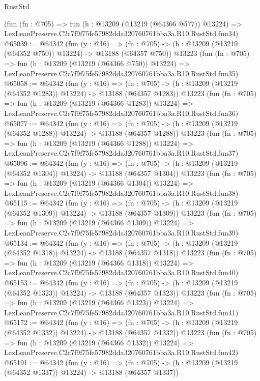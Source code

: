 \begin{lexlean}{RustStd}
\begin{coremodule}
    (fun (fn : @705) =>
    fun (h : @13209 (@13219 (@64366 @577)) @13224) =>
    LexLeanPreserve.C2c7f9f75fe57982dda320760761bba3a.R10.RustStd.fun34)
@65039 := @64342
    (fun (y : @16) =>
    (fn : @705) -> (h : @13209 (@13219 (@64352 @750)) @13224) -> @13188 (@64357 @750))
    @13223
    (fun (fn : @705) =>
    fun (h : @13209 (@13219 (@64366 @750)) @13224) =>
    LexLeanPreserve.C2c7f9f75fe57982dda320760761bba3a.R10.RustStd.fun35)
@65058 := @64342
    (fun (y : @16) =>
    (fn : @705) -> (h : @13209 (@13219 (@64352 @1283)) @13224) -> @13188 (@64357 @1283))
    @13223
    (fun (fn : @705) =>
    fun (h : @13209 (@13219 (@64366 @1283)) @13224) =>
    LexLeanPreserve.C2c7f9f75fe57982dda320760761bba3a.R10.RustStd.fun36)
@65077 := @64342
    (fun (y : @16) =>
    (fn : @705) -> (h : @13209 (@13219 (@64352 @1288)) @13224) -> @13188 (@64357 @1288))
    @13223
    (fun (fn : @705) =>
    fun (h : @13209 (@13219 (@64366 @1288)) @13224) =>
    LexLeanPreserve.C2c7f9f75fe57982dda320760761bba3a.R10.RustStd.fun37)
@65096 := @64342
    (fun (y : @16) =>
    (fn : @705) -> (h : @13209 (@13219 (@64352 @1304)) @13224) -> @13188 (@64357 @1304))
    @13223
    (fun (fn : @705) =>
    fun (h : @13209 (@13219 (@64366 @1304)) @13224) =>
    LexLeanPreserve.C2c7f9f75fe57982dda320760761bba3a.R10.RustStd.fun38)
@65115 := @64342
    (fun (y : @16) =>
    (fn : @705) -> (h : @13209 (@13219 (@64352 @1309)) @13224) -> @13188 (@64357 @1309))
    @13223
    (fun (fn : @705) =>
    fun (h : @13209 (@13219 (@64366 @1309)) @13224) =>
    LexLeanPreserve.C2c7f9f75fe57982dda320760761bba3a.R10.RustStd.fun39)
@65134 := @64342
    (fun (y : @16) =>
    (fn : @705) -> (h : @13209 (@13219 (@64352 @1318)) @13224) -> @13188 (@64357 @1318))
    @13223
    (fun (fn : @705) =>
    fun (h : @13209 (@13219 (@64366 @1318)) @13224) =>
    LexLeanPreserve.C2c7f9f75fe57982dda320760761bba3a.R10.RustStd.fun40)
@65153 := @64342
    (fun (y : @16) =>
    (fn : @705) -> (h : @13209 (@13219 (@64352 @1323)) @13224) -> @13188 (@64357 @1323))
    @13223
    (fun (fn : @705) =>
    fun (h : @13209 (@13219 (@64366 @1323)) @13224) =>
    LexLeanPreserve.C2c7f9f75fe57982dda320760761bba3a.R10.RustStd.fun41)
@65172 := @64342
    (fun (y : @16) =>
    (fn : @705) -> (h : @13209 (@13219 (@64352 @1332)) @13224) -> @13188 (@64357 @1332))
    @13223
    (fun (fn : @705) =>
    fun (h : @13209 (@13219 (@64366 @1332)) @13224) =>
    LexLeanPreserve.C2c7f9f75fe57982dda320760761bba3a.R10.RustStd.fun42)
@65191 := @64342
    (fun (y : @16) =>
    (fn : @705) -> (h : @13209 (@13219 (@64352 @1337)) @13224) -> @13188 (@64357 @1337))

\end{coremodule}
\end{lexlean}
